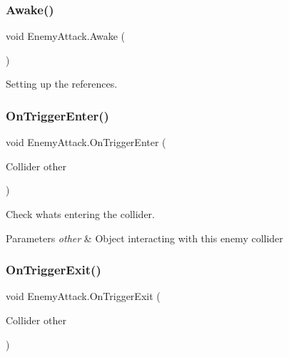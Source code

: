 \mbox{\label{class_enemy_attack_a38a705cd3e92cd80342beaab053aa3b0}} 
\subsubsection{\texorpdfstring{Awake()}{Awake()}}
{\footnotesize\ttfamily void Enemy\+Attack.\+Awake (\begin{DoxyParamCaption}{ }\end{DoxyParamCaption})\hspace{0.3cm}{\ttfamily [private]}}



Setting up the references. 

\mbox{\label{class_enemy_attack_a6375d6dcf8affa64d68d8f9092f8e924}} 
\subsubsection{\texorpdfstring{OnTriggerEnter()}{OnTriggerEnter()}}
{\footnotesize\ttfamily void Enemy\+Attack.\+On\+Trigger\+Enter (\begin{DoxyParamCaption}\item[{Collider}]{other }\end{DoxyParamCaption})\hspace{0.3cm}{\ttfamily [private]}}



Check what\textquotesingle{}s entering the collider. 


\begin{DoxyParams}{Parameters}
{\em other} & Object interacting with this enemy collider \\
\hline
\end{DoxyParams}
\mbox{\label{class_enemy_attack_ab7f1e6aeadeaf6c98fd0e5d51f0623cb}} 
\subsubsection{\texorpdfstring{OnTriggerExit()}{OnTriggerExit()}}
{\footnotesize\ttfamily void Enemy\+Attack.\+On\+Trigger\+Exit (\begin{DoxyParamCaption}\item[{Collider}]{other }\end{DoxyParamCaption})\hspace{0.3cm}{\ttfamily [private]}}



